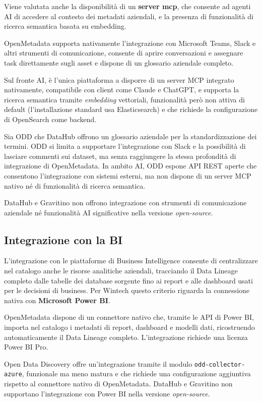 Viene valutata anche la disponibilità di un \textbf{server \gls{mcp}}, che consente ad agenti AI di accedere al contesto dei metadati aziendali, e la presenza di funzionalità di ricerca semantica basata su \gls{embedding}.

OpenMetadata supporta nativamente l'integrazione con Microsoft Teams, Slack e altri strumenti di comunicazione, consente di aprire conversazioni e assegnare task direttamente sugli asset e dispone di un glossario aziendale completo.

Sul fronte AI, è l'unica piattaforma a disporre di un server MCP integrato nativamente, compatibile con client come Claude e ChatGPT, e supporta la ricerca semantica tramite \emph{embedding} vettoriali, funzionalità però non attiva di default (l'installazione standard usa Elasticsearch) e che richiede la configurazione di OpenSearch come backend.

Sia ODD che DataHub offrono un glossario aziendale per la standardizzazione dei termini. 
ODD si limita a supportare l'integrazione con Slack e la possibilità di lasciare commenti sui dataset, ma senza raggiungere la stessa profondità di integrazione di OpenMetadata. 
In ambito AI, ODD espone API REST aperte che consentono l'integrazione con sistemi esterni, ma non dispone di un server MCP nativo né di funzionalità di ricerca semantica.

DataHub e Gravitino non offrono integrazione con strumenti di comunicazione aziendale né funzionalità AI significative nella versione \emph{open-source}.

\subsection{Integrazione con la BI}
L'integrazione con le piattaforme di Business Intelligence consente di centralizzare nel catalogo anche le risorse analitiche aziendali, tracciando il Data Lineage completo 
dalle tabelle dei database sorgente fino ai report e alle dashboard usati per le decisioni di business. Per Wintech questo criterio riguarda la connessione nativa con \textbf{Microsoft Power BI}.

OpenMetadata dispone di un connettore nativo che, tramite le API di Power BI, importa nel catalogo i metadati di report, dashboard e modelli dati, ricostruendo automaticamente il Data Lineage completo. L'integrazione richiede una licenza Power BI Pro.

Open Data Discovery offre un'integrazione tramite il modulo \texttt{odd-collector-azure}, funzionale ma meno matura e che richiede una configurazione aggiuntiva rispetto al connettore nativo di OpenMetadata. 
DataHub e Gravitino non supportano l'integrazione con Power BI nella versione \emph{open-source}.


